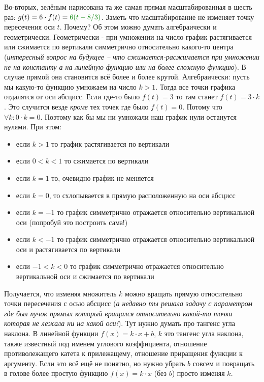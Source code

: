 \documentclass{article}
\begin{document}
Во-вторых, зелёным нарисована та же самая прямая  масштабированная в шесть раз: $g(t)=6\cdot{}f(t)=\color{black!50!green}6(t-8/3)$. Заметь что масштабирование не изменяет точку пересечения оси $t$. Почему? Об этом можно думать алгебраически и геометрически. Геометрически - при умножении на число график растягивается или сжимается по вертикали симметрично относительно какого-то центра (\textit{интересный вопрос на будущее -- что сжимается-расжимается при умножении не на константу а на линейную функцию или на более сложную функцию}). В случае прямой она становится всё более и более крутой. Алгебраически: пусть мы какую-то функцию умножаем на число $k>1$. Тогда все точки графика отдалятся от оси абсцисс. Если где-то было $f(t)=3$ то там станет $f(t)=3\cdot{}k$. Это случится везде \textit{кроме} тех точек где было $f(t)=0$. Потому что $\forall{k}: 0\cdot{}k=0$. Поэтому как бы мы ни умножали наш график нули останутся нулями. При этом:
\begin{itemize}
    \item если $k>1$ то график растягивается по вертикали
    \item если $0<k<1$ то сжимается по вертикали
    \item если $k=1$ то, очевидно график не меняется
    \item если $k=0$, то схлопывается в прямую расположенную на оси абсцисс
    \item если $k=-1$ то график симметрично отражается относительно вертикальной оси (попробуй это построить сама!)
    \item если $k<-1$ то график симметрично отражается относительно вертикальной оси и растягивается по вертикали
    \item если $-1<k<0$ то график симметрично отражается относительно вертикальной оси и сжимается по вертикали
\end{itemize}

Получается, что изменяя множитель $k$ можно вращать прямую относительно точки пересечения с осью абсцисс (\textit{а недавно ты решала задачу с параметром где был пучок прямых который вращался относительно какой-то точки которая не лежала ни на какой оси!}). Тут нужно думать про тангенс угла наклона. В линейной функции $f(x)=k\cdot{}x+b$, $k$ это тангенс угла наклона, также известный под именем углового коэффициента, отношение противолежащего катета к прилежащему, отношение приращения функции к аргументу. Если это всё ещё не понятно, но нужно убрать $b$ совсем и повращать в голове более простую функцию $f(x)=k\cdot{}x$ (без $b$) просто изменяя $k$.
\end{document}
